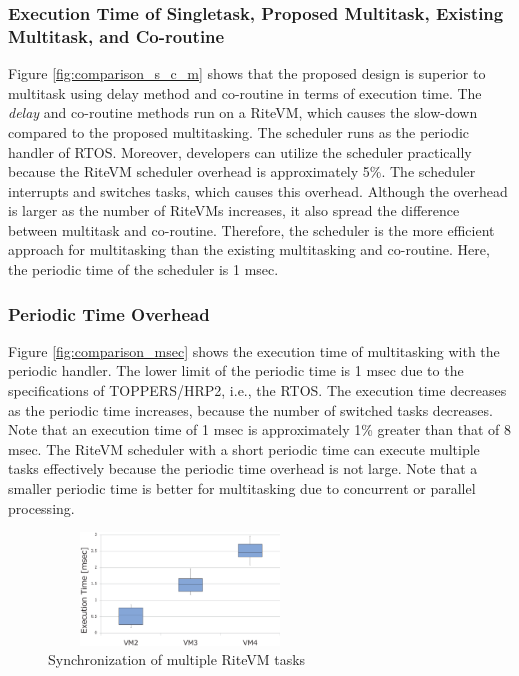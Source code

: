 \documentclass[conference]{IEEEtran/IEEEtran/IEEEtran}
\begin{document}
\subsubsection{Execution Time of Singletask, Proposed Multitask, Existing Multitask, and Co-routine}
Figure \ref{fig:comparison_s_c_m} shows that the proposed design is superior to multitask using delay method and co-routine in terms of execution time.
The {\it delay} and co-routine methods run on a RiteVM, which causes the slow-down compared to the proposed multitasking.
The scheduler runs as the periodic handler of RTOS.
Moreover, developers can utilize the scheduler practically because the RiteVM scheduler overhead is approximately 5\%.
The scheduler interrupts and switches tasks, which causes this overhead.
Although the overhead is larger as the number of RiteVMs increases, it also spread the difference between multitask and co-routine.
Therefore, the scheduler is the more efficient approach for multitasking than the existing multitasking and co-routine.
Here, the periodic time of the scheduler is 1 msec.

\subsubsection{Periodic Time Overhead}
Figure \ref{fig:comparison_msec} shows the execution time of multitasking with the periodic handler.
The lower limit of the periodic time is 1 msec due to the specifications of TOPPERS/HRP2, i.e., the RTOS.
The execution time decreases as the periodic time increases, because the number of switched tasks decreases.
Note that an execution time of 1 msec is approximately 1\% greater than that of 8 msec.
The RiteVM scheduler with a short periodic time can execute multiple tasks effectively because the periodic time overhead is not large.
Note that a smaller periodic time is better for multitasking due to concurrent or parallel processing.

 \begin{figure}[t]
    \centering
    \includegraphics[height=3.0cm,width=7.0cm,clip]{figure/eval_synchronization.eps}
    \vspace{-3mm}
\caption{Synchronization of multiple RiteVM tasks}
    \vspace{-3mm}
\label{fig:eval_synchronization}
\end{figure}
\end{document}
